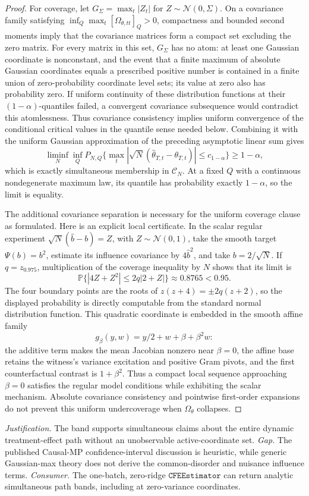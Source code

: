 \documentclass{article}
\begin{document}
\begin{proof}
For coverage, let \(G_\Sigma=\max_t|Z_t|\) for \(Z\sim\mathcal N(0,\Sigma)\).  On a covariance family satisfying \(\inf_Q\max_t[\Omega_{\theta,tt}]_Q>0\), compactness and bounded second moments imply that the covariance matrices form a compact set excluding the zero matrix.  For every matrix in this set, \(G_\Sigma\) has no atom: at least one Gaussian coordinate is nonconstant, and the event that a finite maximum of absolute Gaussian coordinates equals a prescribed positive number is contained in a finite union of zero-probability coordinate level sets; its value at zero also has probability zero.  If uniform continuity of these distribution functions at their \((1-\alpha)\)-quantiles failed, a convergent covariance subsequence would contradict this atomlessness.  Thus covariance consistency implies uniform convergence of the conditional critical values in the quantile sense needed below.  Combining it with the uniform Gaussian approximation of the preceding asymptotic linear sum gives
\[
 \liminf_N\inf_QP_{N,Q}\{\max_t|\sqrt N(\widehat\theta_{T,t}-\theta_{T,t})|\le c_{1-\alpha}\}\ge1-\alpha,
\]
which is exactly simultaneous membership in \(\mathcal C_N\).  At a fixed \(Q\) with a continuous nondegenerate maximum law, its quantile has probability exactly \(1-\alpha\), so the limit is equality.

The additional covariance separation is necessary for the uniform coverage clause as formulated.  Here is an explicit local certificate.  In the scalar regular experiment \(\sqrt N(\widehat b-b)=Z\), with \(Z\sim\mathcal N(0,1)\), take the smooth target \(\Psi(b)=b^2\), estimate its influence covariance by \(4\widehat b^2\), and take \(b=2/\sqrt N\).  If \(q=z_{0.975}\), multiplication of the coverage inequality by \(N\) shows that its limit is
\[
 \mathbb P\{|4Z+Z^2|\le2q|2+Z|\}\approx0.8765<0.95.
\]
The four boundary points are the roots of \(z(z+4)=\pm2q(z+2)\), so the displayed probability is directly computable from the standard normal distribution function.  This quadratic coordinate is embedded in the smooth affine family
\[
 g_\beta(y,w)=y/2+w+\beta+\beta^2w:
\]
the additive term makes the mean Jacobian nonzero near \(\beta=0\), the affine base retains the witness's variance excitation and positive Gram pivots, and the first counterfactual contrast is \(1+\beta^2\).  Thus a compact local sequence approaching \(\beta=0\) satisfies the regular model conditions while exhibiting the scalar mechanism.  Absolute covariance consistency and pointwise first-order expansions do not prevent this uniform undercoverage when \(\Omega_\theta\) collapses.
\end{proof}
\par\smallskip\noindent \textit{Justification.} The band supports simultaneous claims about the entire dynamic treatment-effect path without an unobservable active-coordinate set. \textit{Gap.} The published Causal-MP confidence-interval discussion is heuristic, while generic Gaussian-max theory does not derive the common-disorder and nuisance influence terms. \textit{Consumer.} The one-batch, zero-ridge \(\texttt{CFEEstimator}\) can return analytic simultaneous path bands, including at zero-variance coordinates.
\end{document}
